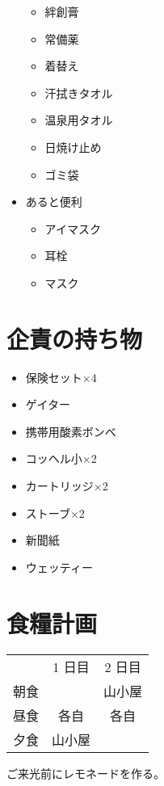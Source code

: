 \documentclass[b5paper,10pt]{ltjsarticle}
\begin{document}
\begin{multicols}{2}
\begin{itemize}
        \begin{itemize}
            \item 絆創膏
            \item 常備薬
            \item 着替え
            \item 汗拭きタオル
            \item 温泉用タオル
            \item 日焼け止め
            \item ゴミ袋
        \end{itemize}
        \item あると便利
        \begin{itemize}
            \item アイマスク
            \item 耳栓
            \item マスク
        \end{itemize}
    \end{itemize}
\end{multicols}

\section{企責の持ち物}

\begin{multicols}{2}
    \begin{itemize}
        \item 保険セット×4
        \item ゲイター
        \item 携帯用酸素ボンベ
        \item コッヘル小×2
        \item カートリッジ×2
        \item ストーブ×2
        \item 新聞紙
        \item ウェッティー
    \end{itemize}
\end{multicols}

\section{食糧計画}

\begin{table}[H]
\begin{tabular}{lcc}
    \hline
    & 1 日目 & 2 日目 \\
    朝食 & & 山小屋 \\
    昼食 & 各自 & 各自 \\
    夕食 & 山小屋 & \\
    \hline
\end{tabular}
\end{table}

ご来光前にレモネードを作る。

\end{document}
